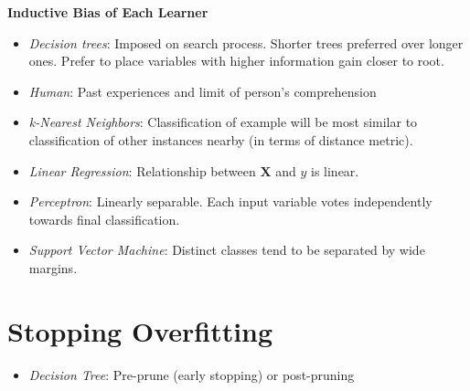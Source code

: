 \documentclass[10pt]{article}
\begin{document}
\begin{multicols}{3}
  \textbf{Inductive Bias of Each Learner}
  \begin{itemize}
    \item \textit{Decision trees}: Imposed on search process. Shorter trees preferred over longer ones. Prefer to place variables with higher information gain closer to root.
    \item \textit{Human}: Past experiences and limit of person's comprehension
    \item \textit{k-Nearest Neighbors}: Classification of example will be most similar to classification of other instances nearby (in terms of distance metric).
    \item \textit{Linear Regression}: Relationship between $\mathbf{X}$ and $y$ is linear.
    \item \textit{Perceptron}: Linearly separable.  Each input variable votes independently towards final classification.
    \item \textit{Support Vector Machine}: Distinct classes tend to be separated by wide margins.
  \end{itemize}

  \section*{Stopping Overfitting}
  \begin{itemize}
    \item \textit{Decision Tree}: Pre-prune (early stopping) or post-pruning
  \end{itemize}
\end{multicols}
\end{document}
